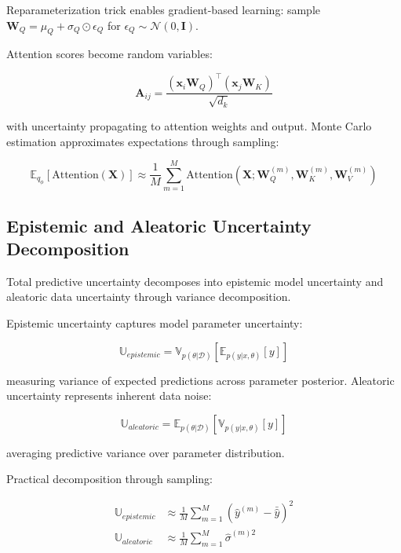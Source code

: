 Reparameterization trick enables gradient-based learning: sample $\mathbf{W}_Q = \mu_Q + \sigma_Q \odot \epsilon_Q$ for $\epsilon_Q \sim \mathcal{N}(0, \mathbf{I})$.

Attention scores become random variables:

\begin{equation}
\mathbf{A}_{ij} = \frac{(\mathbf{x}_i \mathbf{W}_Q)^\top (\mathbf{x}_j \mathbf{W}_K)}{\sqrt{d_k}}
\end{equation}

with uncertainty propagating to attention weights and output. Monte Carlo estimation approximates expectations through sampling:

\begin{equation}
\mathbb{E}_{q_\phi}[\text{Attention}(\mathbf{X})] \approx \frac{1}{M}\sum_{m=1}^M \text{Attention}(\mathbf{X}; \mathbf{W}_Q^{(m)}, \mathbf{W}_K^{(m)}, \mathbf{W}_V^{(m)})
\end{equation}

\subsection{Epistemic and Aleatoric Uncertainty Decomposition}

Total predictive uncertainty decomposes into epistemic model uncertainty and aleatoric data uncertainty through variance decomposition.

Epistemic uncertainty captures model parameter uncertainty:

\begin{equation}
\mathbb{U}_{epistemic} = \mathbb{V}_{p(\theta|\mathcal{D})}[\mathbb{E}_{p(y|x,\theta)}[y]]
\end{equation}

measuring variance of expected predictions across parameter posterior. Aleatoric uncertainty represents inherent data noise:

\begin{equation}
\mathbb{U}_{aleatoric} = \mathbb{E}_{p(\theta|\mathcal{D})}[\mathbb{V}_{p(y|x,\theta)}[y]]
\end{equation}

averaging predictive variance over parameter distribution.

Practical decomposition through sampling:

\begin{align}
\mathbb{U}_{epistemic} &\approx \frac{1}{M}\sum_{m=1}^M (\hat{y}^{(m)} - \bar{\hat{y}})^2 \\
\mathbb{U}_{aleatoric} &\approx \frac{1}{M}\sum_{m=1}^M \hat{\sigma}^{(m)2}
\end{align}

